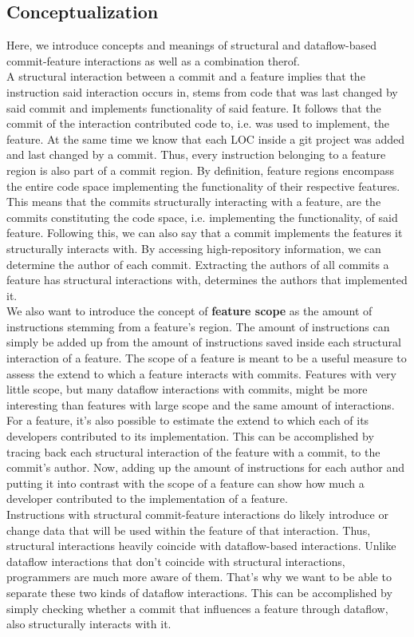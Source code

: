 \subsection*{Conceptualization}

Here, we introduce concepts and meanings of structural and dataflow-based commit-feature interactions as well as a combination therof.  \\
A structural interaction between a commit and a feature implies that the instruction said interaction occurs in, stems from code that was last changed by said commit and implements functionality of said feature.
It follows that the commit of the interaction contributed code to, i.e. was used to implement, the feature. 
At the same time we know that each LOC inside a git project was added and last changed by a commit. 
Thus, every instruction belonging to a feature region is also part of a commit region.
By definition, feature regions encompass the entire code space implementing the functionality of their respective features.
This means that the commits structurally interacting with a feature, are the commits constituting the code space, i.e. implementing the functionality, of said feature.
Following this, we can also say that a commit implements the features it structurally interacts with.
By accessing high-repository information, we can determine the author of each commit.
Extracting the authors of all commits a feature has structural interactions with, determines the authors that implemented it. \\ 

We also want to introduce the concept of \textbf{feature scope} as the amount of instructions stemming from a feature's region.
The amount of instructions can simply be added up from the amount of instructions saved inside each structural interaction of a feature. 
The scope of a feature is meant to be a useful measure to assess the extend to which a feature interacts with commits.
Features with very little scope, but many dataflow interactions with commits, might be more interesting than features with large scope and the same amount of interactions. \\
For a feature, it's also possible to estimate the extend to which each of its developers contributed to its implementation.
This can be accomplished by tracing back each structural interaction of the feature with a commit, to the commit's author.
Now, adding up the amount of instructions for each author and putting it into contrast with the scope of a feature can show how much a developer contributed to the implementation of a feature. \\ 

Instructions with structural commit-feature interactions do likely introduce or change data that will be used within the feature of that interaction.
Thus, structural interactions heavily coincide with dataflow-based interactions. 
Unlike dataflow interactions that don't coincide with structural interactions, programmers are much more aware of them.
That's why we want to be able to separate these two kinds of dataflow interactions.
This can be accomplished by simply checking whether a commit that influences a feature through dataflow, also structurally interacts with it.

